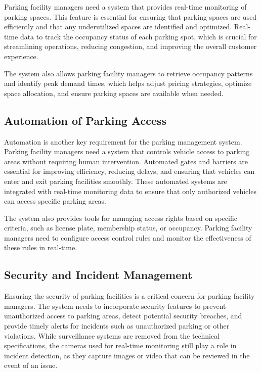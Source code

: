 Parking facility managers need a system that provides real-time monitoring of parking spaces. This feature is essential for ensuring that parking spaces are used efficiently and that any underutilized spaces are identified and optimized. Real-time data to track the occupancy status of each parking spot, which is crucial for streamlining operations, reducing congestion, and improving the overall customer experience.

The system also allows parking facility managers to retrieve occupancy patterns and identify peak demand times, which helps adjust pricing strategies, optimize space allocation, and ensure parking spaces are available when needed.

\subsection{Automation of Parking Access}

Automation is another key requirement for the parking management system. Parking facility managers need a system that controls vehicle access to parking areas without requiring human intervention. Automated gates and barriers are essential for improving efficiency, reducing delays, and ensuring that vehicles can enter and exit parking facilities smoothly. These automated systems are integrated with real-time monitoring data to ensure that only authorized vehicles can access specific parking areas.

The system also provides tools for managing access rights based on specific criteria, such as license plate, membership status, or occupancy. Parking facility managers need to configure access control rules and monitor the effectiveness of these rules in real-time.

\subsection{Security and Incident Management}

Ensuring the security of parking facilities is a critical concern for parking facility managers. The system needs to incorporate security features to prevent unauthorized access to parking areas, detect potential security breaches, and provide timely alerts for incidents such as unauthorized parking or other violations. While surveillance systems are removed from the technical specifications, the cameras used for real-time monitoring still play a role in incident detection, as they capture images or video that can be reviewed in the event of an issue.

